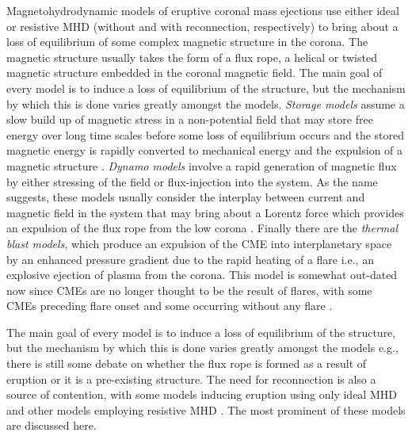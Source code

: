 Magnetohydrodynamic models of eruptive coronal mass ejections use either ideal or resistive MHD (without and with reconnection, respectively) to bring about a loss of equilibrium of some complex magnetic structure in the corona. The magnetic structure usually takes the form of a flux rope, a helical or twisted magnetic structure embedded in the coronal magnetic field. The main goal of every model is to induce a loss of equilibrium of the structure, but the mechanism by which this is done varies greatly amongst the models. {\it Storage models} assume a slow build up of magnetic stress in a non-potential field that may store free energy over long time scales before some loss of equilibrium occurs and the stored magnetic energy is rapidly converted to mechanical energy and the expulsion of a magnetic structure \citep{wolfson1998, forbes1995, antiochos1999}. {\it Dynamo models} involve a rapid generation of magnetic flux by either stressing of the field or flux-injection into the system. As the name suggests, these models usually consider the interplay between current and magnetic field in the system that may bring about a Lorentz force which provides an expulsion of the flux rope from the low corona \citep{chen1989, krall2001, schrijver2008, fan2005}. Finally there are the {\it thermal blast models}, which produce an expulsion of the CME into interplanetary space by an enhanced pressure gradient due to the rapid heating of a flare i.e., an explosive ejection of plasma from the corona.  This model is somewhat out-dated now since CMEs are no longer thought to be the result of flares, with some CMEs preceding flare onset and some occurring without any flare \citep{gosling1993}.

The main goal of every model is to induce a loss of equilibrium of the structure, but the mechanism by which this is done varies greatly amongst the models e.g., there is still some debate on whether the flux rope is formed as a result of eruption or it is a pre-existing structure. The need for reconnection is also a source of contention, with some models inducing eruption using only ideal MHD and other models employing resistive MHD \citep{chen2011}. The most prominent of these models are discussed here.

